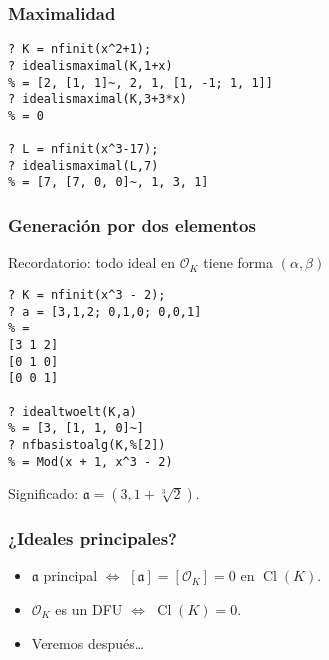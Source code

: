 \documentclass{beamer}
\renewcommand{\O}{\mathcal{O}}
\DeclareMathOperator{\Cl}{Cl}
\begin{document}

\begin{frame}[fragile]
  \frametitle{Maximalidad}

  \begin{shaded}
\begin{verbatim}
? K = nfinit(x^2+1);
? idealismaximal(K,1+x)
% = [2, [1, 1]~, 2, 1, [1, -1; 1, 1]]
? idealismaximal(K,3+3*x)
% = 0

? L = nfinit(x^3-17);
? idealismaximal(L,7)
% = [7, [7, 0, 0]~, 1, 3, 1]
\end{verbatim}
  \end{shaded}
\end{frame}


\begin{frame}[fragile]
  \frametitle{Generación por dos elementos}

  Recordatorio: todo ideal en $\O_K$ tiene forma $ (\alpha,\beta)$

  \begin{shaded}\small
\begin{verbatim}
? K = nfinit(x^3 - 2);
? a = [3,1,2; 0,1,0; 0,0,1]
% = 
[3 1 2]
[0 1 0]
[0 0 1]

? idealtwoelt(K,a)
% = [3, [1, 1, 0]~]
? nfbasistoalg(K,%[2])
% = Mod(x + 1, x^3 - 2)
\end{verbatim}
  \end{shaded}

  Significado: $\mathfrak{a} = (3, 1 + \sqrt[3]{2})$.
\end{frame}


\begin{frame}[fragile]
  \frametitle{¿Ideales principales?}

  \begin{itemize}
  \item $\mathfrak{a}$ principal $\iff$ $[\mathfrak{a}] = [\O_K] = 0$ en $\Cl (K)$.

  \item $\O_K$ es un DFU $\iff$ $\Cl (K) = 0$.

  \item Veremos después\dots
  \end{itemize}
\end{frame}
\end{document}
